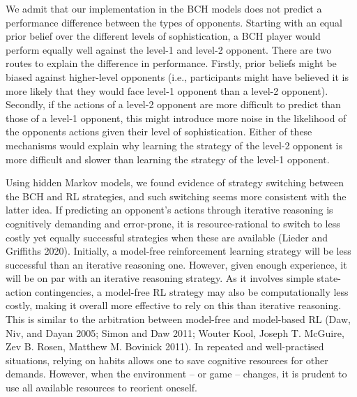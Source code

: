 \documentclass[smallextended]{svjour3}       %
\begin{document}
We admit that our implementation in the BCH models does not predict a
performance difference between the types of opponents. Starting with an
equal prior belief over the different levels of sophistication, a BCH
player would perform equally well against the level-1 and level-2
opponent. There are two routes to explain the difference in performance.
Firstly, prior beliefs might be biased against higher-level opponents
(i.e., participants might have believed it is more likely that they
would face level-1 opponent than a level-2 opponent). Secondly, if the
actions of a level-2 opponent are more difficult to predict than those
of a level-1 opponent, this might introduce more noise in the likelihood
of the opponents actions given their level of sophistication. Either of
these mechanisms would explain why learning the strategy of the level-2
opponent is more difficult and slower than learning the strategy of the
level-1 opponent.

Using hidden Markov models, we found evidence of strategy switching
between the BCH and RL strategies, and such switching seems more
consistent with the latter idea. If predicting an opponent's actions
through iterative reasoning is cognitively demanding and error-prone, it
is resource-rational to switch to less costly yet equally successful
strategies when these are available (Lieder and Griffiths 2020).
Initially, a model-free reinforcement learning strategy will be less
successful than an iterative reasoning one. However, given enough
experience, it will be on par with an iterative reasoning strategy. As
it involves simple state-action contingencies, a model-free RL strategy
may also be computationally less costly, making it overall more
effective to rely on this than iterative reasoning. This is similar to
the arbitration between model-free and model-based RL (Daw, Niv, and
Dayan 2005; Simon and Daw 2011; Wouter Kool, Joseph T. McGuire, Zev B.
Rosen, Matthew M. Bovinick 2011). In repeated and well-practised
situations, relying on habits allows one to save cognitive resources for
other demands. However, when the environment -- or game -- changes, it
is prudent to use all available resources to reorient oneself.
\end{document}
